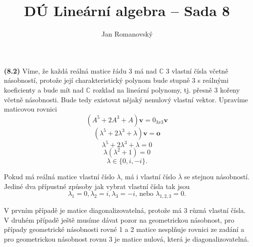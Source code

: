 \documentclass{article}
\title{DÚ Lineární algebra -- Sada 8}
\author{Jan Romanovský}
\begin{document}
\maketitle

\textbf{(8.2)} Víme, že každá reálná matice řádu 3 má nad $\mathbb C$ 3 vlastní čísla včetně násobností, protože její charakteristický polynom bude stupně 3 s reálnými koeficienty a bude mít nad $\mathbb C$ rozklad na lineární polynomy, tj. přesně 3 kořeny včetně násobnosti. Bude tedy existovat nějaký nenulový vlastní vektor. Upravíme maticovou rovnici
$$(A^5+2A^3+A)\textbf{v} = 0_{3x3}\textbf{v} $$
$$(\lambda^5+2\lambda^3+\lambda)\mathbf{v}=\mathbf{o}$$
$$\lambda^5+2\lambda^3+\lambda=0$$
$$\lambda(\lambda^2+1)=0$$
$$\lambda \in \{0, i , -i\}.$$

Pokud má reálná matice vlastní číslo $\lambda$, má i vlastní číslo $\overline{\lambda}$ se stejnou násobností. Jediné dva přípustné způsoby jak vybrat vlastní čísla tak jsou
$$\lambda_1 = 0, \lambda_2 = i, \lambda_3 = -i\text{, nebo } \lambda_{1,2,3} = 0.$$

V prvním případě je matice diagonalizovatelná, protože má 3 různá vlastní čísla. V druhém případě ještě musíme dávat pozor na geometrickou násobnost, pro případy geometrické násobnosti rovné 1 a 2 matice nesplňuje rovnici ze zadání a pro geometrickou násobnost rovnu 3 je matice nulová, která je diagonalizovatelná.
\end{document}
